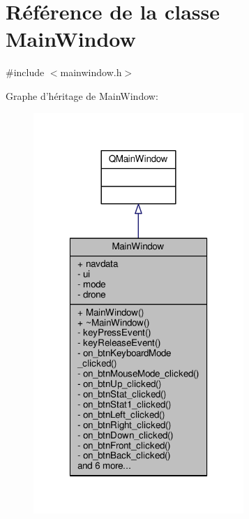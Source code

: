 \hypertarget{class_main_window}{\section{Référence de la classe Main\-Window}
\label{class_main_window}
}


{\ttfamily \#include $<$mainwindow.\-h$>$}



Graphe d'héritage de Main\-Window\-:
\nopagebreak
\begin{figure}[H]
\begin{center}
\leavevmode
\includegraphics[width=226pt]{class_main_window__inherit__graph}
\end{center}
\end{figure}


